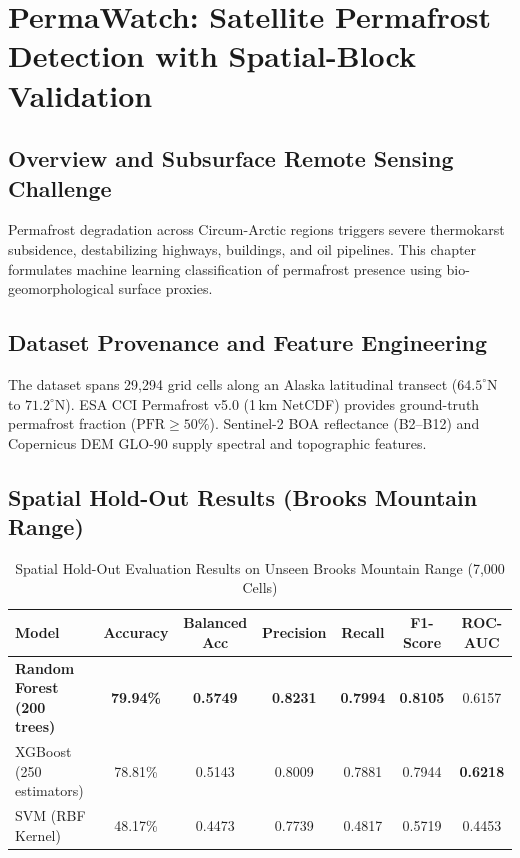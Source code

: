 \documentclass[12pt,a4paper]{report}
\begin{document}
\chapter{PermaWatch: Satellite Permafrost Detection with Spatial-Block Validation}

\section{Overview and Subsurface Remote Sensing Challenge}
Permafrost degradation across Circum-Arctic regions triggers severe thermokarst subsidence, destabilizing highways, buildings, and oil pipelines. This chapter formulates machine learning classification of permafrost presence using bio-geomorphological surface proxies.

\section{Dataset Provenance and Feature Engineering}
The dataset spans 29,294 grid cells along an Alaska latitudinal transect ($64.5^\circ\text{N}$ to $71.2^\circ\text{N}$). ESA CCI Permafrost v5.0 (1\,km NetCDF) provides ground-truth permafrost fraction ($\text{PFR} \ge 50\%$). Sentinel-2 BOA reflectance (B2--B12) and Copernicus DEM GLO-90 supply spectral and topographic features.

\section{Spatial Hold-Out Results (Brooks Mountain Range)}
\begin{table}[H]
\centering
\caption{Spatial Hold-Out Evaluation Results on Unseen Brooks Mountain Range (7,000 Cells)}
\label{tab:permafrost_benchmark}
\begin{tabular}{lcccccc}
\toprule
\textbf{Model} & \textbf{Accuracy} & \textbf{Balanced Acc} & \textbf{Precision} & \textbf{Recall} & \textbf{F1-Score} & \textbf{ROC-AUC} \\
\midrule
\textbf{Random Forest (200 trees)} & \textbf{79.94\%} & \textbf{0.5749} & \textbf{0.8231} & \textbf{0.7994} & \textbf{0.8105} & 0.6157 \\
XGBoost (250 estimators) & 78.81\% & 0.5143 & 0.8009 & 0.7881 & 0.7944 & \textbf{0.6218} \\
SVM (RBF Kernel) & 48.17\% & 0.4473 & 0.7739 & 0.4817 & 0.5719 & 0.4453 \\
\bottomrule
\end{tabular}
\end{table}
\end{document}
